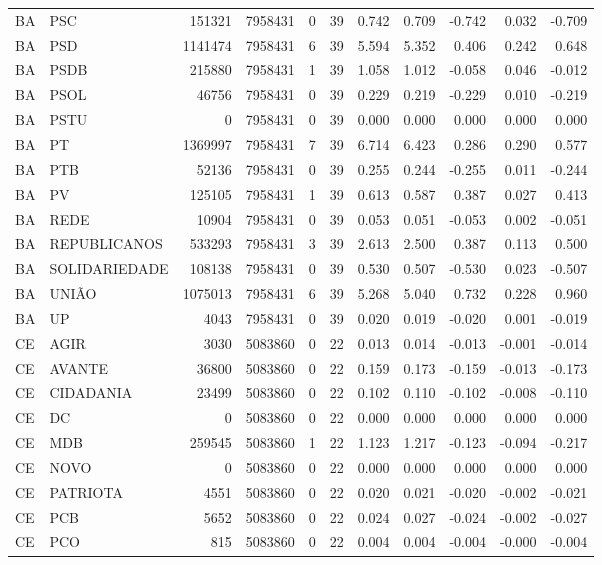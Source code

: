 \begin{landscape}
\begin{longtable}{llrrrrrrrrr}
BA & PSC & 151321 & 7958431 & 0 & 39 & 0.742 & 0.709 & -0.742 & 0.032 & -0.709 \\
BA & PSD & 1141474 & 7958431 & 6 & 39 & 5.594 & 5.352 & 0.406 & 0.242 & 0.648 \\
BA & PSDB & 215880 & 7958431 & 1 & 39 & 1.058 & 1.012 & -0.058 & 0.046 & -0.012 \\
BA & PSOL & 46756 & 7958431 & 0 & 39 & 0.229 & 0.219 & -0.229 & 0.010 & -0.219 \\
BA & PSTU & 0 & 7958431 & 0 & 39 & 0.000 & 0.000 & 0.000 & 0.000 & 0.000 \\
BA & PT & 1369997 & 7958431 & 7 & 39 & 6.714 & 6.423 & 0.286 & 0.290 & 0.577 \\
BA & PTB & 52136 & 7958431 & 0 & 39 & 0.255 & 0.244 & -0.255 & 0.011 & -0.244 \\
BA & PV & 125105 & 7958431 & 1 & 39 & 0.613 & 0.587 & 0.387 & 0.027 & 0.413 \\
BA & REDE & 10904 & 7958431 & 0 & 39 & 0.053 & 0.051 & -0.053 & 0.002 & -0.051 \\
BA & REPUBLICANOS & 533293 & 7958431 & 3 & 39 & 2.613 & 2.500 & 0.387 & 0.113 & 0.500 \\
BA & SOLIDARIEDADE & 108138 & 7958431 & 0 & 39 & 0.530 & 0.507 & -0.530 & 0.023 & -0.507 \\
BA & UNIÃO & 1075013 & 7958431 & 6 & 39 & 5.268 & 5.040 & 0.732 & 0.228 & 0.960 \\
BA & UP & 4043 & 7958431 & 0 & 39 & 0.020 & 0.019 & -0.020 & 0.001 & -0.019 \\
CE & AGIR & 3030 & 5083860 & 0 & 22 & 0.013 & 0.014 & -0.013 & -0.001 & -0.014 \\
CE & AVANTE & 36800 & 5083860 & 0 & 22 & 0.159 & 0.173 & -0.159 & -0.013 & -0.173 \\
CE & CIDADANIA & 23499 & 5083860 & 0 & 22 & 0.102 & 0.110 & -0.102 & -0.008 & -0.110 \\
CE & DC & 0 & 5083860 & 0 & 22 & 0.000 & 0.000 & 0.000 & 0.000 & 0.000 \\
CE & MDB & 259545 & 5083860 & 1 & 22 & 1.123 & 1.217 & -0.123 & -0.094 & -0.217 \\
CE & NOVO & 0 & 5083860 & 0 & 22 & 0.000 & 0.000 & 0.000 & 0.000 & 0.000 \\
CE & PATRIOTA & 4551 & 5083860 & 0 & 22 & 0.020 & 0.021 & -0.020 & -0.002 & -0.021 \\
CE & PCB & 5652 & 5083860 & 0 & 22 & 0.024 & 0.027 & -0.024 & -0.002 & -0.027 \\
CE & PCO & 815 & 5083860 & 0 & 22 & 0.004 & 0.004 & -0.004 & -0.000 & -0.004 \\

\end{longtable}
\end{landscape}

